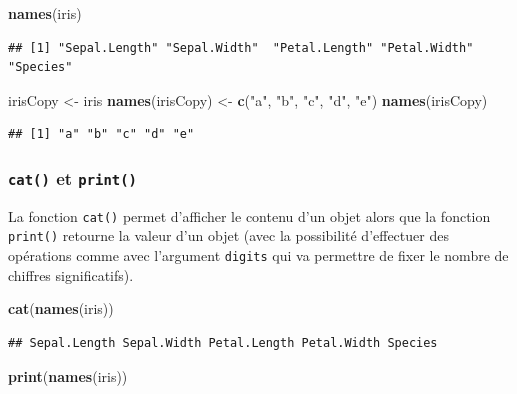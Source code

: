 \documentclass[
]{book}
\newenvironment{Shaded}{\begin{snugshade}}{\end{snugshade}}
\newcommand{\KeywordTok}[1]{\textcolor[rgb]{0.13,0.29,0.53}{\textbf{#1}}}
\newcommand{\NormalTok}[1]{#1}
\newcommand{\StringTok}[1]{\textcolor[rgb]{0.31,0.60,0.02}{#1}}
\begin{document}
\begin{Shaded}
\begin{Highlighting}[]
\KeywordTok{names}\NormalTok{(iris)}
\end{Highlighting}
\end{Shaded}

\begin{verbatim}
## [1] "Sepal.Length" "Sepal.Width"  "Petal.Length" "Petal.Width"  "Species"
\end{verbatim}

\begin{Shaded}
\begin{Highlighting}[]
\NormalTok{irisCopy <-}\StringTok{ }\NormalTok{iris}
\KeywordTok{names}\NormalTok{(irisCopy) <-}\StringTok{ }\KeywordTok{c}\NormalTok{(}\StringTok{"a"}\NormalTok{, }\StringTok{"b"}\NormalTok{, }\StringTok{"c"}\NormalTok{, }\StringTok{"d"}\NormalTok{, }\StringTok{"e"}\NormalTok{)}
\KeywordTok{names}\NormalTok{(irisCopy)}
\end{Highlighting}
\end{Shaded}

\begin{verbatim}
## [1] "a" "b" "c" "d" "e"
\end{verbatim}

\hypertarget{l015print}{%
\subsubsection{\texorpdfstring{\texttt{cat()} et \texttt{print()}}{cat() et print()}}\label{l015print}}

La fonction \texttt{cat()} permet d'afficher le contenu d'un objet alors que la fonction \texttt{print()} retourne la valeur d'un objet (avec la possibilité d'effectuer des opérations comme avec l'argument \texttt{digits} qui va permettre de fixer le nombre de chiffres significatifs).

\begin{Shaded}
\begin{Highlighting}[]
\KeywordTok{cat}\NormalTok{(}\KeywordTok{names}\NormalTok{(iris))}
\end{Highlighting}
\end{Shaded}

\begin{verbatim}
## Sepal.Length Sepal.Width Petal.Length Petal.Width Species
\end{verbatim}

\begin{Shaded}
\begin{Highlighting}[]
\KeywordTok{print}\NormalTok{(}\KeywordTok{names}\NormalTok{(iris))}
\end{Highlighting}
\end{Shaded}
\end{document}
